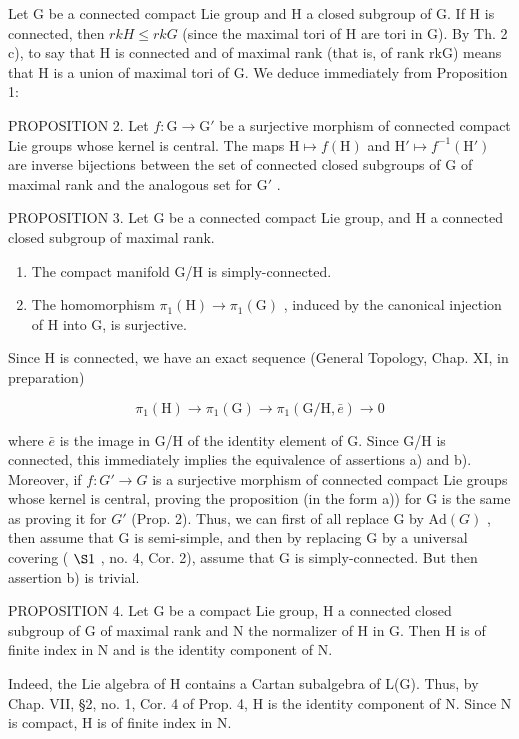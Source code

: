 Let G be a connected compact Lie group and H a closed subgroup of G. If H is connected, then \(rkH \leq rkG\) (since the maximal tori of H are tori in G). By Th. 2 c), to say that H is connected and of maximal rank (that is, of rank rkG) means that H is a union of maximal tori of G. We deduce immediately from Proposition 1:

PROPOSITION 2. Let \(f: \mathrm{G} \to \mathrm{G}'\) be a surjective morphism of connected compact Lie groups whose kernel is central. The maps \(\mathrm{H} \mapsto f(\mathrm{H})\) and \(\mathrm{H}' \mapsto f^{-1}(\mathrm{H}')\) are inverse bijections between the set of connected closed subgroups of \(\mathrm{G}\) of maximal rank and the analogous set for \(\mathrm{G}'\) .

PROPOSITION 3. Let G be a connected compact Lie group, and H a connected closed subgroup of maximal rank.

\begin{enumerate}
\def\labelenumi{\alph{enumi})}
\item
  The compact manifold G/H is simply-connected.
\item
  The homomorphism \(\pi_1(\mathrm{H})\to \pi_1(\mathrm{G})\) , induced by the canonical injection of H into G, is surjective.
\end{enumerate}

Since H is connected, we have an exact sequence (General Topology, Chap. XI, in preparation)

\[
\pi_ {1} (\mathrm{H}) \rightarrow \pi_ {1} (\mathrm{G}) \rightarrow \pi_ {1} (\mathrm{G/H}, \bar {e}) \rightarrow 0
\]

where \(\bar{e}\) is the image in G/H of the identity element of G. Since G/H is connected, this immediately implies the equivalence of assertions a) and b). Moreover, if \(f : G' \to G\) is a surjective morphism of connected compact Lie groups whose kernel is central, proving the proposition (in the form a)) for G is the same as proving it for \(G'\) (Prop. 2). Thus, we can first of all replace G by \(\text{Ad}(G)\) , then assume that G is semi-simple, and then by replacing G by a universal covering ( \(\S1\) , no. 4, Cor. 2), assume that G is simply-connected. But then assertion b) is trivial.

PROPOSITION 4. Let G be a compact Lie group, H a connected closed subgroup of G of maximal rank and N the normalizer of H in G. Then H is of finite index in N and is the identity component of N.

Indeed, the Lie algebra of H contains a Cartan subalgebra of L(G). Thus, by Chap. VII, §2, no. 1, Cor. 4 of Prop. 4, H is the identity component of N. Since N is compact, H is of finite index in N.

